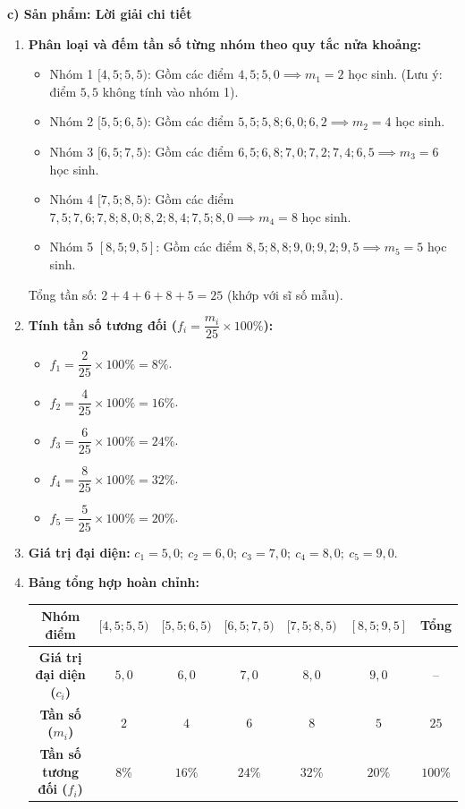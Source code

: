 \documentclass[12pt, a4paper]{article}
\begin{document}
\noindent \textbf{c) Sản phẩm: Lời giải chi tiết}
\begin{enumerate}[leftmargin=0.6cm]
    \item \textbf{Phân loại và đếm tần số từng nhóm theo quy tắc nửa khoảng:}
    \begin{itemize}
        \item Nhóm 1 $[4{,}5; 5{,}5)$: Gồm các điểm $4{,}5; 5{,}0 \implies m_1 = 2$ học sinh. (Lưu ý: điểm $5{,}5$ không tính vào nhóm 1).
        \item Nhóm 2 $[5{,}5; 6{,}5)$: Gồm các điểm $5{,}5; 5{,}8; 6{,}0; 6{,}2 \implies m_2 = 4$ học sinh.
        \item Nhóm 3 $[6{,}5; 7{,}5)$: Gồm các điểm $6{,}5; 6{,}8; 7{,}0; 7{,}2; 7{,}4; 6{,}5 \implies m_3 = 6$ học sinh.
        \item Nhóm 4 $[7{,}5; 8{,}5)$: Gồm các điểm $7{,}5; 7{,}6; 7{,}8; 8{,}0; 8{,}2; 8{,}4; 7{,}5; 8{,}0 \implies m_4 = 8$ học sinh.
        \item Nhóm 5 $[8{,}5; 9{,}5]$: Gồm các điểm $8{,}5; 8{,}8; 9{,}0; 9{,}2; 9{,}5 \implies m_5 = 5$ học sinh.
    \end{itemize}
    Tổng tần số: $2 + 4 + 6 + 8 + 5 = 25$ (khớp với sĩ số mẫu).
    \item \textbf{Tính tần số tương đối ($f_i = \dfrac{m_i}{25} \times 100\%$):}
    \begin{itemize}
        \item $f_1 = \dfrac{2}{25} \times 100\% = 8\%$.
        \item $f_2 = \dfrac{4}{25} \times 100\% = 16\%$.
        \item $f_3 = \dfrac{6}{25} \times 100\% = 24\%$.
        \item $f_4 = \dfrac{8}{25} \times 100\% = 32\%$.
        \item $f_5 = \dfrac{5}{25} \times 100\% = 20\%$.
    \end{itemize}
    \item \textbf{Giá trị đại diện:}
    $c_1 = 5{,}0; \ c_2 = 6{,}0; \ c_3 = 7{,}0; \ c_4 = 8{,}0; \ c_5 = 9{,}0$.
    \item \textbf{Bảng tổng hợp hoàn chỉnh:}
    \begin{center}
    \small
    \begin{tabular}{|c|c|c|c|c|c|c|}
    \hline
    \textbf{Nhóm điểm} & $[4{,}5; 5{,}5)$ & $[5{,}5; 6{,}5)$ & $[6{,}5; 7{,}5)$ & $[7{,}5; 8{,}5)$ & $[8{,}5; 9{,}5]$ & \textbf{Tổng} \\ \hline
    \textbf{Giá trị đại diện ($c_i$)} & $5{,}0$ & $6{,}0$ & $7{,}0$ & $8{,}0$ & $9{,}0$ & -- \\ \hline
    \textbf{Tần số ($m_i$)} & $2$ & $4$ & $6$ & $8$ & $5$ & $25$ \\ \hline
    \textbf{Tần số tương đối ($f_i$)} & $8\%$ & $16\%$ & $24\%$ & $32\%$ & $20\%$ & $100\%$ \\ \hline
    \end{tabular}
    \end{center}
\end{enumerate}
\end{document}
